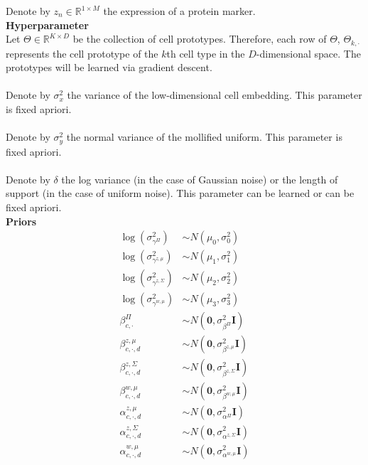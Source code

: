 \documentclass[a4paper]{article}
\begin{document}
Denote by $z_n \in \mathbb{R}^{1 \times M}$ the expression of a protein marker.\\
\textbf{Hyperparameter}\\
Let $\Theta \in \mathbb{R}^{K\times D}$ be the collection of cell prototypes. 
Therefore, each row of $\Theta$, $\Theta_{k,\cdot}$ represents the cell prototype 
of the $k$th cell type in the $D$-dimensional space. The prototypes will be learned via gradient descent.\\~\\
Denote by $\sigma^2_x$ the variance of the low-dimensional cell embedding. This parameter is fixed apriori. \\~\\
Denote by $\sigma^2_y$ the normal variance of the mollified uniform. This parameter is fixed apriori.\\~\\
Denote by $\delta$ the log variance (in the case of Gaussian noise) or the length of support (in the case of uniform noise). 
This parameter can be learned or can be fixed apriori.\\
\textbf{Priors}\\
\begin{align*}
    \log(\sigma^2_{\gamma^\Pi}) &\sim N(\mu_0, \sigma^2_0)\\
    \log(\sigma^2_{\gamma^{z,\mu}}) &\sim N(\mu_1, \sigma^2_1)\\
    \log(\sigma^2_{\gamma^{z,\Sigma}}) &\sim N(\mu_2, \sigma^2_2)\\
    \log(\sigma^2_{\gamma^{w,\mu}}) &\sim N(\mu_3, \sigma^2_3)\\
    \beta^{\Pi}_{c,\cdot} &\sim N(\mathbf{0}, \sigma^2_{\beta^\Pi}\mathbf{I})\\
    \beta^{z,\mu}_{c,\cdot,d} &\sim N(\mathbf{0}, \sigma^2_{\beta^{z, \mu}}\mathbf{I})\\
    \beta^{z,\Sigma}_{c,\cdot,d} &\sim N(\mathbf{0}, \sigma^2_{\beta^{z, \Sigma}}\mathbf{I})\\
    \beta^{w,\mu}_{c,\cdot,d} &\sim N(\mathbf{0}, \sigma^2_{\beta^{w, \mu}}\mathbf{I})\\
    \alpha^{z,\mu}_{c,\cdot,d} &\sim N(\mathbf{0}, \sigma^2_{\alpha^\Pi}\mathbf{I})\\
    \alpha^{z,\Sigma}_{c,\cdot,d} &\sim N(\mathbf{0}, \sigma^2_{\alpha^{z, \Sigma}}\mathbf{I})\\
    \alpha^{w,\mu}_{c,\cdot,d} &\sim N(\mathbf{0}, \sigma^2_{\alpha^{w, \mu}}\mathbf{I})
\end{align*}
\end{document}
